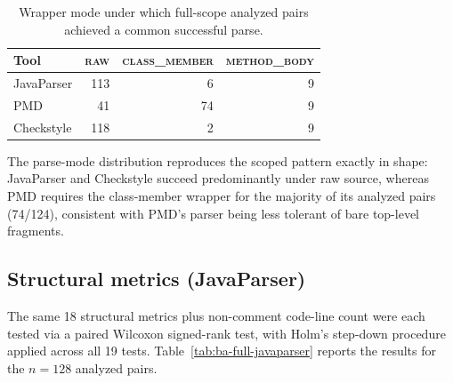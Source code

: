 \begin{table}[htbp]
\centering
\caption{Wrapper mode under which full-scope analyzed pairs achieved a common successful parse.}
\label{tab:ba-full-parse-mode}
\begin{tabular}{lrrr}
\toprule
Tool & \textsc{raw} & \textsc{class\_member} & \textsc{method\_body} \\
\midrule
JavaParser & 113 & 6  & 9 \\
PMD        & 41  & 74 & 9 \\
Checkstyle & 118 & 2  & 9 \\
\bottomrule
\end{tabular}
\end{table}

The parse-mode distribution reproduces the scoped pattern exactly in shape: JavaParser and Checkstyle succeed predominantly under raw source, whereas PMD requires the class-member wrapper for the majority of its analyzed pairs (74/124), consistent with PMD's parser being less tolerant of bare top-level fragments.

\subsection{Structural metrics (JavaParser)}
\label{sec:ba-full-javaparser}

The same 18 structural metrics plus non-comment code-line count were each tested via a paired Wilcoxon signed-rank test, with Holm's step-down procedure applied across all 19 tests.
Table~\ref{tab:ba-full-javaparser} reports the results for the $n=128$ analyzed pairs.

